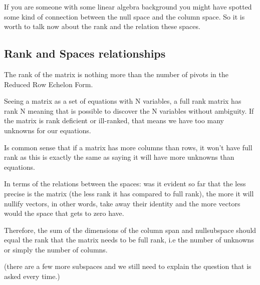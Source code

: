 \Vhrulefill

\par If you are someone with some linear algebra background you might have spotted some kind of connection between the null space and the column space. So it is worth to talk now about the rank and the relation these spaces.

\subsection{Rank and Spaces relationships}

\par The rank of the matrix is nothing more than the number of pivots in the Reduced Row Echelon Form.
\par Seeing a matrix as a set of equations with N variables, a full rank matrix has rank N meaning that is possible to discover the N variables without ambiguity. If the matrix is rank deficient or ill-ranked, that means we have too many unknowns for our equations.

\par Is common sense that if a matrix has more columns than rows, it won't have full rank as this is exactly the same as saying it will have more unknowns than equations.

\par In terms of the relations between the spaces: was it evident so far that the less precise is the matrix (the less rank it has compared to full rank), the more it will nullify vectors, in other words, take away their identity and the more vectors would the space that gets to zero have.

\par Therefore, the sum of the dimensions of the column span and nullsubspace should equal the rank that the matrix needs to be full rank, i.e the number of unknowns or simply the number of columns.






(there are a few more subspaces and we still need to explain the question that is asked every time.)


